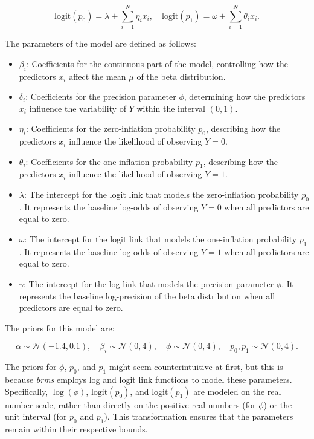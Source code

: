 \documentclass[12pt]{article}
\begin{document}
\[
\text{logit}(p_0) = \lambda + \sum_{i=1}^{N} \eta_i x_i, \quad
\text{logit}(p_1) = \omega + \sum_{i=1}^{N} \theta_i x_i.
\]

The parameters of the model are defined as follows:
\begin{itemize}
  \item \( \beta_i \): Coefficients for the continuous part of the model, controlling how the predictors \( x_i \) affect the mean \( \mu \) of the beta distribution. 
  \item \( \delta_i \): Coefficients for the precision parameter \( \phi \), determining how the predictors \( x_i \) influence the variability of \( Y \) within the interval \( (0, 1) \).
  \item \( \eta_i \): Coefficients for the zero-inflation probability \( p_0 \), describing how the predictors \( x_i \) influence the likelihood of observing \( Y = 0 \).
  \item \( \theta_i \): Coefficients for the one-inflation probability \( p_1 \), describing how the predictors \( x_i \) influence the likelihood of observing \( Y = 1 \).
  \item \( \lambda \): The intercept for the logit link that models the zero-inflation probability \( p_0 \). It represents the baseline log-odds of observing \( Y = 0 \) when all predictors are equal to zero.
  \item \( \omega \): The intercept for the logit link that models the one-inflation probability \( p_1 \). It represents the baseline log-odds of observing \( Y = 1 \) when all predictors are equal to zero.
  \item \( \gamma \): The intercept for the log link that models the precision parameter \( \phi \). It represents the baseline log-precision of the beta distribution when all predictors are equal to zero.
\end{itemize}

The priors for this model are:

\[
\alpha \sim \mathcal{N}(-1.4, 0.1), \quad \beta_i \sim \mathcal{N}(0, 4), \quad \phi \sim \mathcal{N}(0,4), \quad p_0, p_1 \sim \mathcal{N}(0,4).
\]

The priors for \( \phi \), \( p_0 \), and \( p_1 \) might seem counterintuitive at first, but this is because \textit{brms} employs log and logit link functions to model these parameters. Specifically, \( \log(\phi) \), \( \text{logit}(p_0) \), and \( \text{logit}(p_1) \) are modeled on the real number scale, rather than directly on the positive real numbers (for \( \phi \)) or the unit interval (for \( p_0 \) and \( p_1 \)). This transformation ensures that the parameters remain within their respective bounds.
\end{document}
